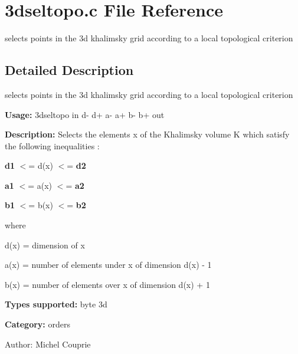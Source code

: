 \section{3dseltopo.c File Reference}
\label{3dseltopo_8c}
selects points in the 3d khalimsky grid according to a local topological criterion  




\label{_details}
\subsection{Detailed Description}
selects points in the 3d khalimsky grid according to a local topological criterion 

{\bf Usage:} 3dseltopo in d- d+ a- a+ b- b+ out

{\bf Description:} Selects the elements x of the Khalimsky volume K which satisfy the following inequalities :

{\bf d1} $<$= d(x) $<$= {\bf d2} 

{\bf a1} $<$= a(x) $<$= {\bf a2} 

{\bf b1} $<$= b(x) $<$= {\bf b2} 

where

d(x) = dimension of x

a(x) = number of elements under x of dimension d(x) - 1

b(x) = number of elements over x of dimension d(x) + 1

{\bf Types supported:} byte 3d

{\bf Category:} orders

\begin{Desc}
\item[Author:]Michel Couprie \end{Desc}
